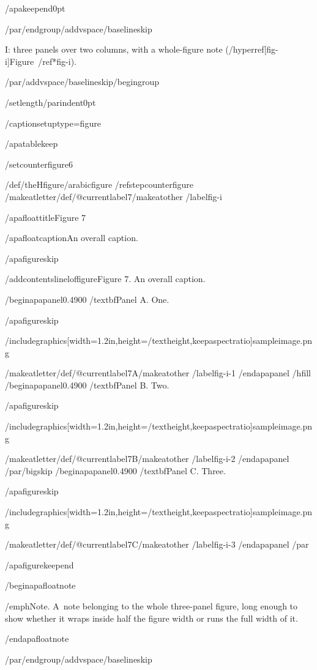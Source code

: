 /apakeepend{0pt}

/par/endgroup/addvspace{/baselineskip}

I: three panels over two columns, with a whole-figure note
(/hyperref[fig-i]{Figure~/ref*{fig-i}}).

/par/addvspace{/baselineskip}/begingroup

/setlength{/parindent}{0pt}

/captionsetup{type=figure}

/apatablekeep

/setcounter{figure}{6}

/def/theHfigure{/arabic{figure}}%
/refstepcounter{figure}%
/makeatletter/def/@currentlabel{7}/makeatother%
/label{fig-i}

/apafloattitle{Figure 7}

/apafloatcaption{An overall caption.}

/apafigureskip

/addcontentsline{lof}{figure}{Figure 7. An overall caption.}

/begin{apapanel}{0.4900}%
/textbf{Panel A}. One.

/apafigureskip

/includegraphics[width=1.2in,height=/textheight,keepaspectratio]{sampleimage.png}

/makeatletter/def/@currentlabel{7A}/makeatother%
/label{fig-i-1}
/end{apapanel}%
/hfill
/begin{apapanel}{0.4900}%
/textbf{Panel B}. Two.

/apafigureskip

/includegraphics[width=1.2in,height=/textheight,keepaspectratio]{sampleimage.png}

/makeatletter/def/@currentlabel{7B}/makeatother%
/label{fig-i-2}
/end{apapanel}%
/par/bigskip
/begin{apapanel}{0.4900}%
/textbf{Panel C}. Three.

/apafigureskip

/includegraphics[width=1.2in,height=/textheight,keepaspectratio]{sampleimage.png}

/makeatletter/def/@currentlabel{7C}/makeatother%
/label{fig-i-3}
/end{apapanel}%
/par

/apafigurekeepend

/begin{apafloatnote}

/emph{Note}. A~note belonging to the whole three-panel figure, long
enough to show whether it wraps inside half the figure width or runs the
full width of it.

/end{apafloatnote}

/par/endgroup/addvspace{/baselineskip}

